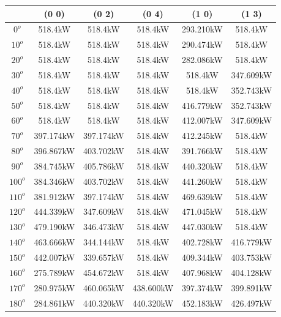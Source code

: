         \singlespacing
        \begin{table}[H]
        	\centering
        	\begin{tabular}{|c|c|c|c|c|c|} \hline
        			& (0 0)		& (0 2)		& (0 4)		& (1 0)		& (1 3)		\\ \hline
        		$0^o$	& 518.4kW	& 518.4kW	& 518.4kW	& 293.210kW	& 518.4kW	\\ \hline
        		$10^o$	& 518.4kW	& 518.4kW	& 518.4kW	& 290.474kW	& 518.4kW	\\ \hline
        		$20^o$	& 518.4kW	& 518.4kW	& 518.4kW	& 282.086kW	& 518.4kW	\\ \hline
        		$30^o$	& 518.4kW	& 518.4kW	& 518.4kW	& 518.4kW	& 347.609kW	\\ \hline
        		$40^o$	& 518.4kW	& 518.4kW	& 518.4kW	& 518.4kW	& 352.743kW	\\ \hline
        		$50^o$	& 518.4kW	& 518.4kW	& 518.4kW	& 416.779kW	& 352.743kW	\\ \hline
        		$60^o$	& 518.4kW	& 518.4kW	& 518.4kW	& 412.007kW	& 347.609kW	\\ \hline
        		$70^o$	& 397.174kW	& 397.174kW	& 518.4kW	& 412.245kW	& 518.4kW	\\ \hline
        		$80^o$	& 396.867kW	& 403.702kW	& 518.4kW	& 391.766kW	& 518.4kW	\\ \hline
        		$90^o$	& 384.745kW	& 405.786kW	& 518.4kW	& 440.320kW	& 518.4kW	\\ \hline
        		$100^o$	& 384.346kW	& 403.702kW	& 518.4kW	& 441.260kW	& 518.4kW	\\ \hline
        		$110^o$	& 381.912kW	& 397.174kW	& 518.4kW	& 469.639kW	& 518.4kW	\\ \hline
        		$120^o$	& 444.339kW	& 347.609kW	& 518.4kW	& 471.045kW	& 518.4kW	\\ \hline
        		$130^o$	& 479.190kW	& 346.473kW	& 518.4kW	& 447.030kW	& 518.4kW	\\ \hline
        		$140^o$	& 463.666kW	& 344.144kW	& 518.4kW	& 402.728kW	& 416.779kW	\\ \hline
        		$150^o$	& 442.007kW	& 339.657kW	& 518.4kW	& 409.344kW	& 403.753kW	\\ \hline
        		$160^o$	& 275.789kW	& 454.672kW	& 518.4kW	& 407.968kW	& 404.128kW	\\ \hline
        		$170^o$	& 280.975kW	& 460.065kW	& 438.600kW	& 397.374kW	& 399.891kW	\\ \hline
        		$180^o$	& 284.861kW	& 440.320kW	& 440.320kW	& 452.183kW	& 426.497kW	\\ \hline

\end{tabular}
\end{table}
